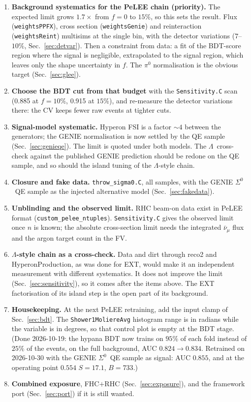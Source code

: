 \documentclass[11pt,a4paper]{article}
\newcommand{\Szero}{\ensuremath{\Sigma^{0}}}
\newcommand{\Lam}{\ensuremath{\Lambda}}
\newcommand{\numubar}{\ensuremath{\bar{\nu}_\mu}}
\begin{document}
\begin{enumerate}
  \item \textbf{Background systematics for the PeLEE chain (priority).} The expected
        limit grows $1.7\times$ from $f=0$ to $15\%$, so this sets the result. Flux
        (\texttt{weightsPPFX}), cross section (\texttt{weightsGenie}) and reinteraction
        (\texttt{weightsReint}) multisims at the single bin, with the detector variations
        ($7$--$10\%$, Sec.~\ref{sec:detvar}). Then a constraint from data: a fit of the
        BDT-score region where the signal is negligible, extrapolated to the signal
        region, which leaves only the shape uncertainty in $f$. The $\pi^0$
        normalisation is the obvious target (Sec.~\ref{sec:glee}).
  \item \textbf{Choose the BDT cut from that budget} with the \texttt{Sensitivity.C}
        scan (0.885 at $f=10\%$, 0.915 at $15\%$), and re-measure the detector
        variations there: the CV keeps fewer raw events at tighter cuts.
  \item \textbf{Signal-model systematic.} Hyperon FSI is a factor $\sim4$ between the
        generators; the GENIE normalisation is now settled by the QE sample
        (Sec.~\ref{sec:genieqe}). The limit is quoted under both models. The
        \Lam\ cross-check against the published GENIE prediction should be redone on
        the QE sample, and so should the island tuning of the \Lam-style chain.
  \item \textbf{Closure and fake data.} \texttt{throw\_sigma0.C}, all samples, with the
        GENIE \Szero\ QE sample as the injected alternative model (Sec.~\ref{sec:fakedata}).
  \item \textbf{Unblinding and the observed limit.} RHC beam-on data exist in PeLEE
        format (\texttt{custom\_pelee\_ntuples}). \texttt{Sensitivity.C} gives the
        observed limit once $n$ is known; the absolute cross-section limit needs the
        integrated $\numubar$ flux and the argon target count in the FV.
  \item \textbf{\Lam-style chain as a cross-check.} Data and dirt through reco2 and
        HyperonProduction, as was done for EXT, would make it an independent
        measurement with different systematics. It does not improve the limit
        (Sec.~\ref{sec:sensitivity}), so it comes after the items above. The EXT
        factorisation of its island step is the open part of its background.
  \item \textbf{Housekeeping.} At the next PeLEE retraining, add the input clamp of
        Sec.~\ref{sec:bdt}. The \texttt{Shower1MoliereAvg} histogram range is in radians
        while the variable is in degrees, so that control plot is empty at the BDT stage.
        (Done 2026-10-19: the hypana BDT now trains on $95\%$ of each fold instead of
        $25\%$ of the events, on the full background, AUC $0.824\to0.834$. Retrained on
        2026-10-30 with the GENIE \Szero\ QE sample as signal: AUC $0.855$, and at the
        operating point $0.554$ $S=17.1$, $B=733$.)
  \item \textbf{Combined exposure}, FHC$+$RHC (Sec.~\ref{sec:exposure}), and the
        framework port (Sec.~\ref{sec:port}) if it is still wanted.
\end{enumerate}
\end{document}
